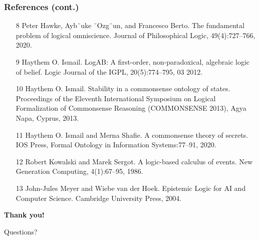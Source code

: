 \documentclass[aspectratio=169]{beamer}
\begin{document}
\begin{frame}
\frametitle{References (cont.)}
\footnotesize
\begin{itemize}
    \item [8] Peter Hawke, Ayb¨uke ¨Ozg¨un, and Francesco Berto. The fundamental problem of
    logical omniscience. Journal of Philosophical Logic, 49(4):727–766, 2020.
    \item [9] Haythem O. Ismail. LogAB: A first-order, non-paradoxical, algebraic logic of belief.
    Logic Journal of the IGPL, 20(5):774–795, 03 2012.
    \item [10] Haythem O. Ismail. Stability in a commonsense ontology of states. Proceedings of
    the Eleventh International Symposium on Logical Formalization of Commonsense
    Reasoning (COMMONSENSE 2013), Agya Napa, Cyprus, 2013.
    \item [11] Haythem O. Ismail and Merna Shafie. A commonsense theory of secrets. IOS Press,
    Formal Ontology in Information Systems:77–91, 2020.
    \item [12] Robert Kowalski and Marek Sergot. A logic-based calculus of events. New Generation
    Computing, 4(1):67–95, 1986.
    \item [13] John-Jules Meyer and Wiebe van der Hoek. Epistemic Logic for AI and Computer
    Science. Cambridge University Press, 2004.
\end{itemize}
\end{frame}
  

\begin{frame}[c]
\centering
\Huge
\textbf{Thank you!}

\vspace{1cm}

\LARGE
Questions?
\end{frame}

\end{document}
